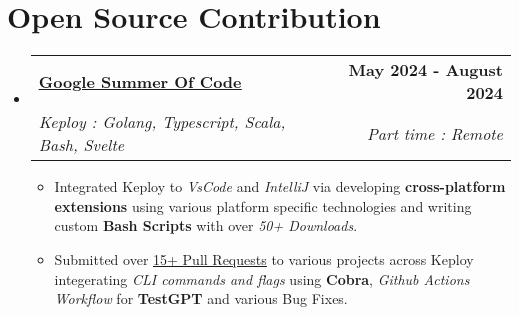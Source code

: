 \documentclass[a4paper,11pt]{article}
\makeatletter
\newcommand{\resumeSubheading}[4]{
  \vspace{-2pt}\item
    \begin{tabular*}{1.0\textwidth}[t]{l@{\extracolsep{\fill}}r}
      \textbf{#1} & \textbf{\small #2} \\
      \textit{\small#3} & \textit{\small #4} \\
    \end{tabular*}\vspace{-7pt}
}
\newcommand{\resumeSubHeadingListStart}{\begin{itemize}[leftmargin=0.0in, label={}]}
\newcommand{\resumeSubHeadingListEnd}{\end{itemize}}
\newcommand{\resumeItemListStart}{\begin{itemize}}
\newcommand{\resumeItemListEnd}{\end{itemize}\vspace{-5pt}}
\makeatother
\begin{document}
\section{Open Source Contribution}
    \resumeSubHeadingListStart
        \resumeSubheading
            {\underline{\href{https://summerofcode.withgoogle.com/programs/2024/projects/XKj0YXC7}{Google Summer Of Code}}}
            {May 2024 - August 2024}
            {Keploy : Golang, Typescript, Scala, Bash, Svelte }{Part time : Remote}
            \resumeItemListStart
                \item Integrated Keploy to \textit{VsCode} and \textit{IntelliJ} via developing \textbf{cross-platform extensions} using various platform specific technologies and writing custom \textbf{Bash Scripts} with over \textit{50+ Downloads}.
                
                \item Submitted over \underline{\href{https://gist.github.com/SkySingh04/6583e1be7b05b818df7d5b224b37df67}{15+ Pull Requests}} to various projects across Keploy integerating \textit{CLI commands and flags} using \textbf{Cobra}, \textit{Github Actions Workflow} for \textbf{TestGPT} and various Bug Fixes.
            \resumeItemListEnd
    \resumeSubHeadingListEnd
\vspace{-10pt}
\end{document}
